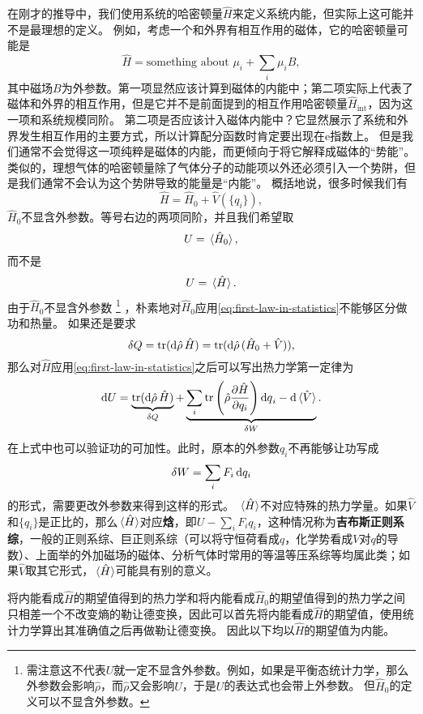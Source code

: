 \documentclass[hyperref, UTF8, a4paper]{ctexart}
\newcommand*{\ee}{\mathrm{e}}
\begin{document}
在刚才的推导中，我们使用系统的哈密顿量$\hat{H}$来定义系统内能，但实际上这可能并不是最理想的定义。
例如，考虑一个和外界有相互作用的磁体，它的哈密顿量可能是
\[
    \hat{H} = \text{something about $\mu_i$} + \sum_i \mu_i B,
\]
其中磁场$B$为外参数。第一项显然应该计算到磁体的内能中；第二项实际上代表了磁体和外界的相互作用，但是它并不是前面提到的相互作用哈密顿量$\hat{H}_\text{int}$，因为这一项和系统规模同阶。
第二项是否应该计入磁体内能中？它显然展示了系统和外界发生相互作用的主要方式，所以计算配分函数时肯定要出现在$\ee$指数上。
但是我们通常不会觉得这一项纯粹是磁体的内能，而更倾向于将它解释成磁体的“势能”。
类似的，理想气体的哈密顿量除了气体分子的动能项以外还必须引入一个势阱，但是我们通常不会认为这个势阱导致的能量是“内能”。
概括地说，很多时候我们有
\[
    \hat{H} = \hat{H}_\text{0} + \hat{V}(\{q_i\}),
\]
$\hat{H}_0$不显含外参数。等号右边的两项同阶，并且我们希望取
\[
    U = \expval*{\hat{H}_0},
\]
而不是
\[
    U = \expval*{\hat{H}}.
\]
由于$\hat{H}_0$不显含外参数%
\footnote{需注意这不代表$U$就一定不显含外参数。例如，如果是平衡态统计力学，那么外参数会影响$\hat{\rho}$，而$\hat{\rho}$又会影响$U$，于是$U$的表达式也会带上外参数。
但$\hat{H}_0$的定义可以不显含外参数。}%
，朴素地对$\hat{H}_0$应用\eqref{eq:first-law-in-statistics}不能够区分做功和热量。
如果还是要求
\[
    \var{Q} = \trace (\dd{\hat{\rho}} \hat{H}) = \trace (\dd{\hat{\rho}} (\hat{H}_0 + \hat{V})), 
\]
那么对$\hat{H}$应用\eqref{eq:first-law-in-statistics}之后可以写出热力学第一定律为
\begin{equation}
    \dd{U} = \underbrace{\trace (\dd{\hat{\rho}} \hat{H})}_{\var{Q}} + \underbrace{\sum_i \trace \left( \hat{\rho} \pdv{\hat{H}}{q_i} \right) \dd{q}_i - \dd{\expval*{\hat{V}}}}_{\var{W}}.
\end{equation}
在上式中也可以验证功的可加性。此时，原本的外参数$q_i$不再能够让功写成
\[
    \var{W} = \sum_i F_i \dd{q_i}
\]
的形式，需要更改外参数来得到这样的形式。
$\expval*{\hat{H}}$不对应特殊的热力学量。如果$\hat{V}$和$\{q_i\}$是正比的，那么$\expval*{\hat{H}}$对应\textbf{焓}，即$U - \sum_i F_i q_i$，这种情况称为\textbf{吉布斯正则系综}，一般的正则系综、巨正则系综（可以将守恒荷看成$q$，化学势看成$V$对$q$的导数）、上面举的外加磁场的磁体、分析气体时常用的等温等压系综等均属此类；如果$\hat{V}$取其它形式，$\expval*{\hat{H}}$可能具有别的意义。

将内能看成$\hat{H}$的期望值得到的热力学和将内能看成$\hat{H}_0$的期望值得到的热力学之间只相差一个不改变熵的勒让德变换，因此可以首先将内能看成$\hat{H}$的期望值，使用统计力学算出其准确值之后再做勒让德变换。
因此以下均以$\hat{H}$的期望值为内能。
\end{document}
